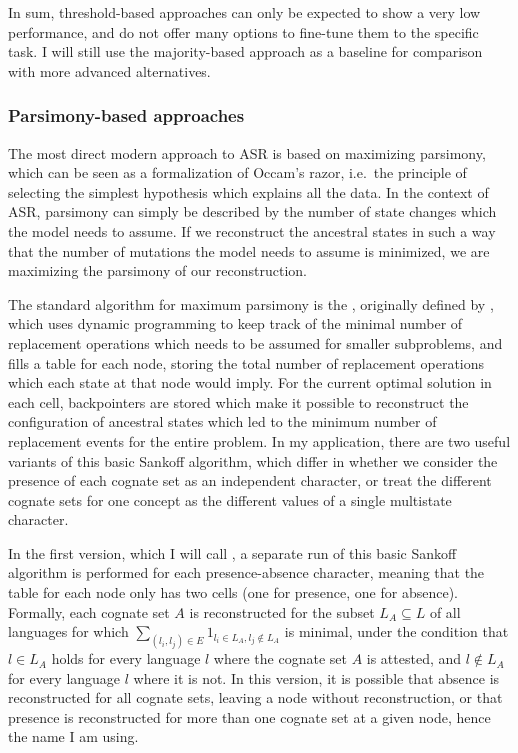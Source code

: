 In sum, threshold-based approaches can only be expected to show a very low performance, and do not offer many options to fine-tune them to the specific task. I will still use the majority-based approach as a baseline for comparison with more advanced alternatives.

\subsubsection{Parsimony-based approaches}
The most direct modern approach to ASR is based on maximizing parsimony, which can be seen as a formalization of Occam's razor, i.e.\ the principle of selecting the simplest hypothesis which explains all the data. In the context of ASR, parsimony can simply be described by the number of state changes which the model needs to assume. If we reconstruct the ancestral states in such a way that the number of mutations the model needs to assume is minimized, we are maximizing the parsimony of our reconstruction.

The standard algorithm for maximum parsimony is the , originally defined by \cite{sankoff1972}, which uses dynamic programming to keep track of the minimal number of replacement operations which needs to be assumed for smaller subproblems, and fills a table for each node, storing the total number of replacement operations which each state at that node would imply. For the current optimal solution in each cell, backpointers are stored which make it possible to reconstruct the configuration of ancestral states which led to the minimum number of replacement events for the entire problem. In my application, there are two useful variants of this basic Sankoff algorithm, which differ in whether we consider the presence of each cognate set as an independent character, or treat the different cognate sets for one concept as the different values of a single multistate character.

In the first version, which I will call \textit{}, a separate run of this basic Sankoff algorithm is performed for each presence-absence character, meaning that the table for each node only has two cells (one for presence, one for absence). Formally, each cognate set $A$ is reconstructed for the subset $L_A \subseteq L$ of all languages for which $\sum_{(l_i,l_j) \in E} 1_{l_i \in L_A, l_j \notin L_A}$ is minimal, under the condition that $l \in L_A$ holds for every language $l$ where the cognate set $A$ is attested, and $l \notin L_A$ for every language $l$ where it is not. In this version, it is possible that absence is reconstructed for all cognate sets, leaving a node without reconstruction, or that presence is reconstructed for more than one cognate set at a given node, hence the name I am using.

